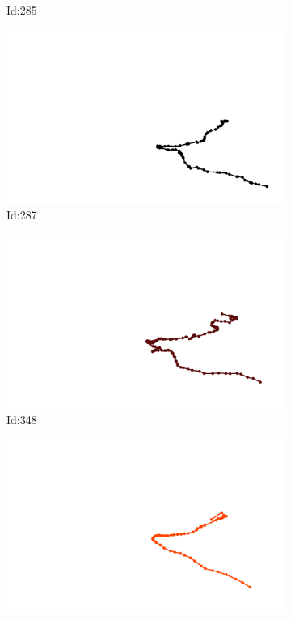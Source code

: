 \documentclass[12pt,twoside]{report}
\begin{document}
\begin{figure}
\begin{subfigure}[b]{0.20\textwidth}
\caption{Id:285}
\end{subfigure}
\begin{subfigure}[b]{0.20\textwidth}
\centering
\includegraphics[width=\textwidth]{../trajectories/287.png}
\caption{Id:287}
\end{subfigure}
\begin{subfigure}[b]{0.20\textwidth}
\centering
\includegraphics[width=\textwidth]{../trajectories/348.png}
\caption{Id:348}
\end{subfigure}
\begin{subfigure}[b]{0.20\textwidth}
\centering
\includegraphics[width=\textwidth]{../trajectories/356.png}

\end{subfigure}
\end{figure}
\end{document}
